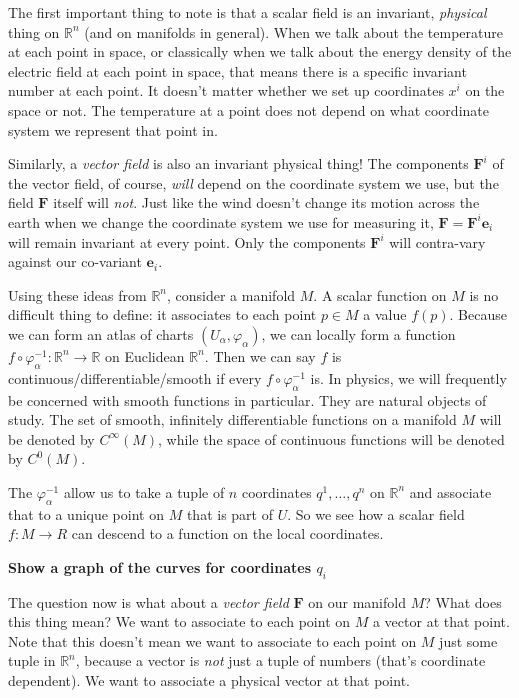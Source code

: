 	The first important thing to note is that a scalar field is an invariant, \emph{physical} thing on $\mathbb{R}^n$ (and on manifolds in general). When we talk about the temperature at each point in space, or classically when we talk about the energy density of the electric field at each point in space, that means there is a specific invariant number at each point. It doesn't matter whether we set up coordinates $x^i$ on the space or not. The temperature at a point does not depend on what coordinate system we represent that point in. 
	
	Similarly, a \emph{vector field} is also an invariant physical thing! The components $\mathbf F^i$ of the vector field, of course, \emph{will} depend on the coordinate system we use, but the field $\mathbf{F}$ itself will \emph{not}. Just like the wind doesn't change its motion across the earth when we change the coordinate system we use for measuring it, $\mathbf{F} = \mathbf{F}^i \mathbf e_i$ will remain invariant at every point. Only the components $\mathbf{F}^i$ will contra-vary against our co-variant $\mathbf e_i$.
	
	Using these ideas from $\mathbb{R}^n$, consider a manifold $M$. A scalar function on $M$ is no difficult thing to define: it associates to each point $p \in M$ a value $f(p)$. Because we can form an atlas of charts $(U_\alpha, \varphi_\alpha)$, we can locally form a function $f \circ \varphi_\alpha^{-1} : \mathbb{R}^n \rightarrow \mathbb R$ on Euclidean $\mathbb{R}^n$. Then we can say $f$ is continuous/differentiable/smooth if every $f \circ \varphi_\alpha^{-1}$ is. In physics, we will frequently be concerned with smooth functions in particular. They are natural objects of study. The set of smooth, infinitely differentiable functions on a manifold $M$ will be denoted by $C^\infty(M)$, while the space of continuous functions will be denoted by $C^0(M)$.
	
	The $\varphi_\alpha^{-1}$ allow us to take a tuple of $n$ coordinates $q^1, \dots, q^n$ on $\mathbb{R}^n$ and associate that to a unique point on $M$ that is part of $U$. So we see how a scalar field $f: M \rightarrow R$ can descend to a function on the local coordinates. 
	
	\textbf{Show a graph of the curves for coordinates $q_i$}
	
	The question now is what about a \emph{vector field} $\mathbf{F}$ on our manifold $M$? What does this thing mean? We want to associate to each point on $M$ a vector at that point. Note that this doesn't mean we want to associate to each point on $M$ just some tuple in $\mathbb{R}^n$, because a vector is \emph{not} just a tuple of numbers (that's coordinate dependent). We want to associate a physical vector at that point. 
	
